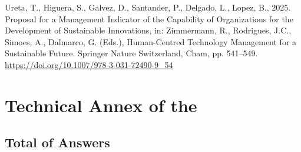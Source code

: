 \documentclass[
  12pt,
  oneside]{book}
\newlength{\cslhangindent}
\newenvironment{CSLReferences}[2] %
 {\begin{list}{}{%
  \setlength{\itemindent}{0pt}
  \setlength{\leftmargin}{0pt}
  \setlength{\parsep}{0pt}
  \ifodd #1
   \setlength{\leftmargin}{\cslhangindent}
   \setlength{\itemindent}{-1\cslhangindent}
  \fi
  \setlength{\itemsep}{#2\baselineskip}}}
 {\end{list}}
\begin{document}
\begin{CSLReferences}{1}{0}
Ureta, T., Higuera, S., Galvez, D., Santander, P., Delgado, L., Lopez,
B., 2025. Proposal for a {Management Indicator} of the {Capability} of
{Organizations} for the {Development} of {Sustainable Innovations}, in:
Zimmermann, R., Rodrigues, J.C., Simoes, A., Dalmarco, G. (Eds.),
Human-{Centred Technology Management} for a {Sustainable Future}.
Springer Nature Switzerland, Cham, pp. 541--549.
\url{https://doi.org/10.1007/978-3-031-72490-9_54}

\end{CSLReferences}

\appendix

\chapter{Technical Annex of the}\label{sec-instrument}

\section{Total of Answers}\label{total-of-answers}
\end{document}
